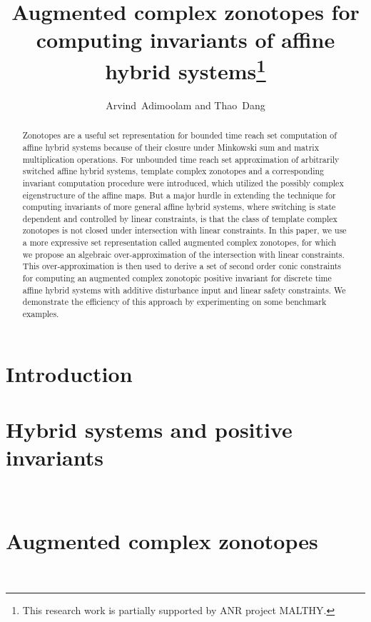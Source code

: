 \documentclass{llncs}
\title{Augmented complex zonotopes for computing invariants of affine hybrid systems\thanks{This research work is partially supported by ANR project MALTHY.}
}
\author{Arvind\ Adimoolam and Thao\ Dang
}
\institute{\ Verimag,~Grenoble, France\\ \url{{santosh.adimoolam,thao.dang}@univ-grenoble-alpes.fr}.
}
\begin{document}
\maketitle

\begin{abstract}
Zonotopes are a useful set representation for bounded time reach set
computation of affine hybrid systems because of their closure under
Minkowski sum and matrix multiplication operations.  For unbounded
time reach set approximation of arbitrarily switched affine hybrid
systems, template complex zonotopes and a corresponding invariant
computation procedure were introduced, which utilized the possibly
complex eigenstructure of the affine maps.  But a major hurdle in
extending the technique for computing invariants of more general
affine hybrid systems, where switching is state dependent and
controlled by linear constraints, is that the class of template
complex zonotopes is not closed under intersection with linear
constraints.  In this paper, we use a more expressive set
representation called augmented complex zonotopes, for which we
propose an algebraic over-approximation of the intersection with
linear constraints.  This over-approximation is then used to derive a
set of second order conic constraints for computing an augmented
complex zonotopic positive invariant for discrete time affine hybrid
systems with additive disturbance input and linear safety constraints.
We demonstrate the efficiency of this approach by experimenting on
some benchmark examples.
\end{abstract}

\section{Introduction}


\section{Hybrid systems and positive invariants}~\label{sec:system}




\section{Augmented complex zonotopes}~\label{sec:acz}


\end{document}
